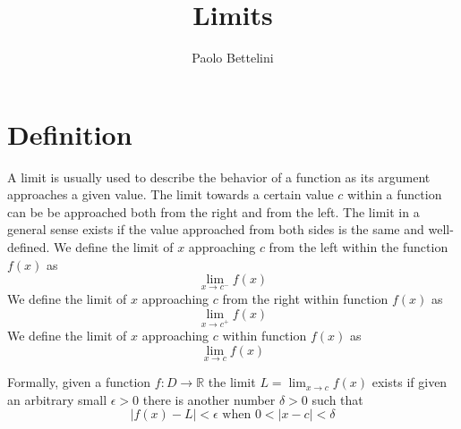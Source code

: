 \documentclass[a4paper]{article}
\title{Limits}
\author{Paolo Bettelini}
\date{}
\begin{document}
\maketitle
\tableofcontents
\pagebreak

\section{Definition}

A limit is usually used to describe the behavior of a function as its argument approaches a given value.
The limit towards a certain value \(c\) within a function can be be approached both from the right and from the left.
The limit in a general sense exists if the value approached from both sides is the same and well-defined.
We define the limit of \(x\) approaching \(c\) from the left within the function \(f(x)\) as
\[
    \lim_{x\to c^{-}}f(x)
\]
We define the limit of \(x\) approaching \(c\) from the right within function \(f(x)\) as
\[
    \lim_{x\to c^{+}}f(x)
\]
We define the limit of \(x\) approaching \(c\) within function \(f(x)\) as
\[
    \lim_{x\to c}f(x)
\]

Formally, given a function \(f:D\to \mathbb{R}\) the limit \(L=\lim_{x\to c}f(x)\) exists if given an arbitrary small \(\epsilon >0\) there is another number \(\delta >0\) such that
\[
    |f(x)-L|<\epsilon
    \text{ when }
    0<|x-c|<\delta
\]

\begin{center}
\end{center}
\end{document}
